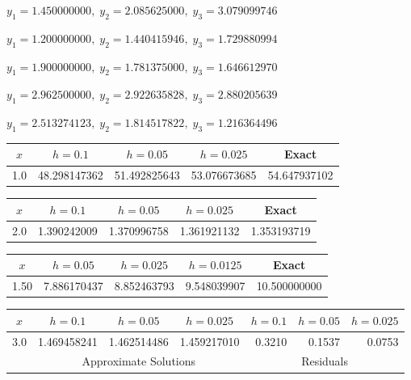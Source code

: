 \medskip

$y_{1}=1.450000000,\;y_{2}=2.085625000,\;y_{3}=3.079099746$

$y_{1}=1.200000000,\;y_{2}=1.440415946,\;y_{3}=1.729880994$

$y_{1}=1.900000000,\;y_{2}=1.781375000,\;y_{3}=1.646612970$

$y_{1}=2.962500000,\;y_{2}=2.922635828,\;y_{3}=2.880205639$

$y_{1}=2.513274123,\;y_{2}=1.814517822,\;y_{3}=1.216364496$

\medskip

\quad
{\small
\begin{tabular}{|c|r|r|r|r|}\hline
\multicolumn{1}{|c|}{$x$}&
\multicolumn{1}{|c|}{$h=0.1$}&
\multicolumn{1}{|c|}{$h=0.05$}&
\multicolumn{1}{|c|}{$h=0.025$}&
\multicolumn{1}{|c|}{Exact}\\ \hline
1.0 & 48.298147362 &  51.492825643 & 53.076673685 &  54.647937102 \\
\hline
\end{tabular}}

\bigskip

\quad
{\small
\begin{tabular}{|c|r|r|r|r|}\hline
\multicolumn{1}{|c|}{$x$}&
\multicolumn{1}{|c|}{$h=0.1$}&
\multicolumn{1}{|c|}{$h=0.05$}&
\multicolumn{1}{|c|}{$h=0.025$}&
\multicolumn{1}{|c|}{Exact}\\ \hline
2.0 & 1.390242009 & 1.370996758 & 1.361921132 & 1.353193719\\
\hline
\end{tabular}}

\bigskip

 \quad
{\small
\begin{tabular}{|c|r|r|r|r|}\hline
\multicolumn{1}{|c|}{$x$}&
\multicolumn{1}{|c|}{$h=0.05$}&
\multicolumn{1}{|c|}{$h=0.025$}&
\multicolumn{1}{|c|}{$h=0.0125$}&
\multicolumn{1}{|c|}{Exact}\\ \hline
1.50 &  7.886170437 & 8.852463793 & 9.548039907 & 10.500000000 \\
\hline
\end{tabular}}

\bigskip

 \quad
{\small
\begin{tabular}{|c|r|r|r|r|r|r|}\hline
\multicolumn{1}{|c|}{$x$}&
\multicolumn{1}{|c|}{$h=0.1$}&
\multicolumn{1}{|c|}{$h=0.05$}&
\multicolumn{1}{|c|}{$h=0.025$}&
\multicolumn{1}{|c|}{$h=0.1$}&
\multicolumn{1}{|c|}{$h=0.05$}&
\multicolumn{1}{|c|}{$h=0.025$}\\ \hline
3.0 & 1.469458241 & 1.462514486 & 1.459217010 & 0.3210 & 0.1537 & 0.0753 \\
\hline
&\multicolumn{3}{c|}{Approximate Solutions}&
\multicolumn{3}{c|}{Residuals}\\\hline
\end{tabular}}

